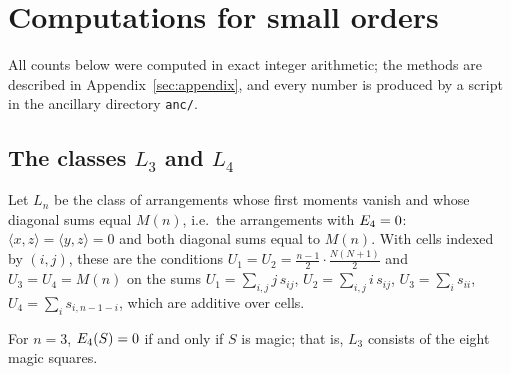 \section{Computations for small orders}
\label{sec:computations}

All counts below were computed in exact integer arithmetic; the methods are described in Appendix~\ref{sec:appendix}, and every number is produced by a script in the ancillary directory \texttt{anc/}.

\subsection{The classes \texorpdfstring{$L_3$}{L3} and \texorpdfstring{$L_4$}{L4}}
\label{sec:lowmode_n4}

Let $L_n$ be the class of arrangements whose first moments vanish and whose diagonal sums equal $M(n)$, i.e.\ the arrangements with $E_4=0$: $\langle x,z\rangle=\langle y,z\rangle=0$ and both diagonal sums equal to $M(n)$.
With cells indexed by $(i,j)$, these are the conditions $U_1=U_2=\frac{n-1}2\cdot\frac{N(N+1)}2$ and $U_3=U_4=M(n)$ on the sums
$U_1=\sum_{i,j}j\,s_{ij}$, $U_2=\sum_{i,j}i\,s_{ij}$, $U_3=\sum_is_{ii}$, $U_4=\sum_is_{i,n-1-i}$, which are additive over cells.

\begin{proposition}
\label{prop:n3_lowmode}
For $n=3$, $E_4(S)=0$ if and only if $S$ is magic; that is, $L_3$ consists of the eight magic squares.
\end{proposition}

